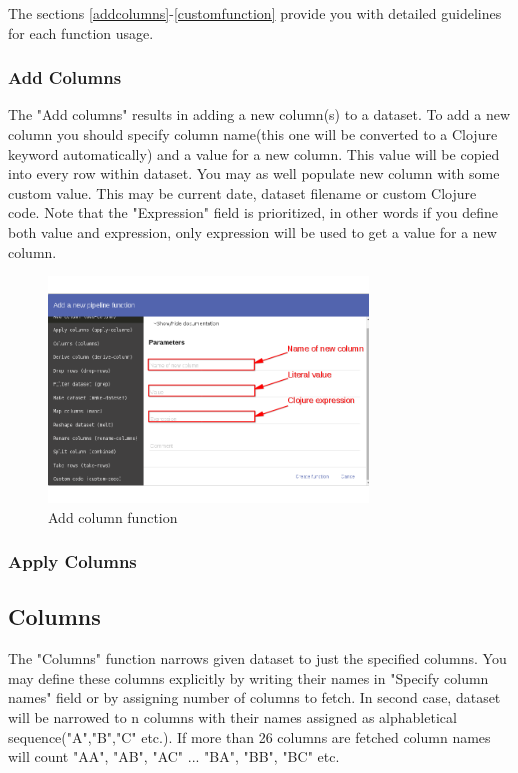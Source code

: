 \documentclass[USenglish]{article}
\begin{document}
  The sections \ref{addcolumns}-\ref{customfunction} provide you with detailed guidelines for each function usage.


\subsubsection{Add Columns \label{addcolumns}}

The "Add columns"  results in adding a new column(s) to a dataset. To add a new column you should specify column name(this one will be converted to a Clojure keyword automatically) and a value for a new column. This value will be copied into every row within dataset. You may as well populate new column with some custom value. This may be current date, dataset filename or custom Clojure code. Note that the "Expression" field is prioritized, in other words if you define both value and expression, only expression will be used to get a value for a new column.

 \begin{center}
\begin{figure}[!htbp]
\centering
\includegraphics[height=6cm] {addcolumnf.png}
 \caption{Add column function \label{meta}}
\end{figure}
\end{center}

\subsubsection{Apply Columns}
\subsection{Columns}
The "Columns" function narrows given dataset to just the specified columns. You may define these columns explicitly by writing their names in "Specify column names" field or by assigning  number of columns to fetch. In second case, dataset will be narrowed to n columns with their names assigned as alphabletical sequence("A","B","C" etc.). If more than 26 columns are fetched column names will count "AA", "AB", "AC" ... "BA", "BB", "BC" etc.
\end{document}
